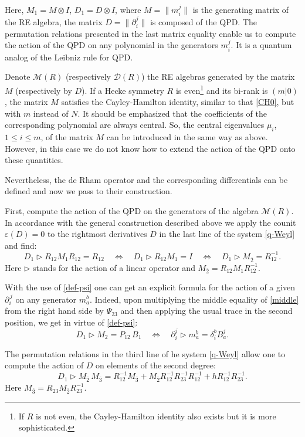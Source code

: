 \documentclass[10pt,a4paper]{amsart}
\newcommand{\pa}{\partial}
\newcommand{\MM}{\mathcal{M}}
\newcommand{\de}{\delta}
\newcommand{\ov}{\overline}
\newcommand{\DD}{\mathcal{D}}
\numberwithin{equation}{section}
\begin{document}
Here, $M_1 = M\otimes I$, $D_1= D\otimes I$, where $M=\|m_i^j\|$ is the generating matrix of the RE algebra, the matrix
$D=\|\pa_i^j\|$ is composed of the QPD. The permutation relations presented in the last matrix equality enable us to compute
the action of the QPD on any polynomial in the generators $m_i^j$. It is a quantum analog of the Leibniz rule for QPD.

Denote $\MM(R)$ (respectively $\DD(R)$) the RE algebras generated by the matrix $M$ (respectively by $D$). If a Hecke
symmetry $R$ is even\footnote{If $R$ is not even, the Cayley-Hamilton identity also exists but it is more sophisticated.} and its
bi-rank is $(m|0)$, the  matrix $M$ satisfies the Cayley-Hamilton identity, similar to that \eqref{CH0}, but with $m$ instead of $N$.
It should be emphasized that the coefficients of the corresponding polynomial are always central. So, the central eigenvalues
$\mu_i$, $1\le i\le m$, of the matrix $M$ can be introduced in the same way as above. However, in this case we do not know
how to extend the action of the QPD onto these quantities.

Nevertheless, the de Rham operator and the corresponding differentials can be defined and now we pass to their construction.

First, compute the action of the QPD on the generators of the algebra $\MM(R)$. In accordance with the general construction
described above we apply the counit $\varepsilon(D) = 0$ to the rightmost derivatives $D$ in the last line of the
system  \eqref{q-Weyl} and find:
\begin{equation}
D_1\triangleright R_{12} M_1R_{12} = R_{12} \quad  \Leftrightarrow \quad D_1\triangleright R_{12} M_1= I \quad
\Leftrightarrow \quad D_1\triangleright M_{\ov 2}=R_{12}^{-1}.
\label{middle}
\end{equation}
Here $\triangleright$ stands for the action of a linear operator and $M_{\overline 2} = R_{12}M_1R_{12}^{-1}$.

With the use of \eqref{def-psi} one can get an explicit formula for the action of a given $\partial_i^{\,j}$ on any generator $m_a^b$.
Indeed, upon multiplying the middle equality of \eqref{middle} from the right hand side by $\Psi_{23}$
and then applying the usual trace in the second position, we get in virtue of \eqref{def-psi}:
\[
D_1 \triangleright M_2=P_{12}\, B_1 \quad \Leftrightarrow \quad \pa_i^j\triangleright m_a^b=\de_i^b B_a^j.
\]

The permutation relations in the third line of he system \eqref{q-Weyl} allow one to compute the action of $D$ on elements of
the second degree:
\begin{equation}
D_1\triangleright M_{\ov 2}\, M_{\ov 3}=R_{12}^{-1} M_{\ov 3}+M_{\ov 2}R_{12}^{-1} R_{23}^{-1}R_{12}^{-1}+
h R_{12}^{-1}R_{23}^{-1}.
\label{secdeg}
\end{equation}
Here $M_{\overline 3} = R_{23}M_{\overline 2}R_{23}^{-1}.$
\end{document}

